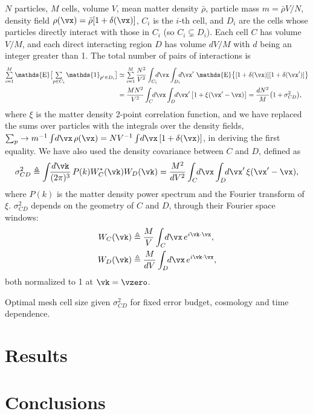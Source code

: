 \documentclass[a4paper]{article}
\DeclareMathOperator*{\E}{\mathds{E}}
\DeclareMathOperator{\tsum}{{\textstyle\sum}}
\newcommand{\1}{\mathds{1}}
\renewcommand{\d}{d}
\newcommand{\YL}[1]{\textcolor{Bittersweet}{#1}}
\begin{document}
$N$ particles, $M$ cells, volume $V$, mean matter density
$\bar\rho$, particle mass $m = \bar\rho V / N$, density field $\rho(\vx)
= \bar\rho [1 + \delta(\vx)]$, $C_i$ is the $i$-th cell, and $D_i$ are
the cells whose particles directly interact with those in $C_i$ (so $C_i
\subsetneq D_i$).
Each cell $C$ has volume $V / M$, and each direct interacting region $D$
has volume $d V / M$ with $d$ being an integer greater than 1.
The total number of pairs of interactions is
%
\begin{align}
\tsum_{i=1}^M \E \bigl[ \tsum_{p\in C_i} \1_{p'\in D_i} \bigr]
%
&\simeq \tsum_{i=1}^M \frac{N^2}{V^2}
  \int_{C_i} \!\!\!\d\vx \int_{D_i} \!\!\!\d\vx'\,
  \E \bigl\{ [1 + \delta(\vx)] [1 + \delta(\vx')] \bigr\} \nonumber\\
%
&= \frac{M N^2}{V^2} \int_C \!\!\d\vx \int_D \!\!\d\vx'\,
  \bigl[ 1 + \xi(\vx' - \vx) \bigr]
= \frac{d N^2}M  \bigl( 1 + \sigma^2_{CD} \bigr),
\end{align}
%
where $\xi$ is the matter density 2-point correlation function, and we
have replaced the sums over particles with the integrals over the
density fields, $\sum_p \to m^{-1} \int \!\d\vx\, \rho(\vx) = N V^{-1}
\int \!\d\vx\, [1 + \delta(\vx)]$, in deriving the first equality.
We have also used the density covariance between $C$ and $D$, defined as
%
\begin{equation}
\sigma^2_{CD} \triangleq \int \!\!\frac{\d\vk}{(2\pi)^3}\,
  P(k) W_C^*(\vk) W_D(\vk)
= \frac{M^2}{d V^2} \int_C \!\!\d\vx \int_D \!\!\d\vx'\,
  \xi(\vx' - \vx),
\end{equation}
%
where $P(k)$ is the matter density power spectrum and the Fourier
transform of $\xi$.
$\sigma^2_{CD}$ depends on the geometry of $C$ and $D$, through their
Fourier space windows:
%
\begin{align}
W_C(\vk) &\triangleq \frac{M}V \int_C \!\!\d\vx\, e^{i\vk\cdot\vx},
  \nonumber\\
W_D(\vk) &\triangleq \frac{M}{dV} \int_D \!\!\d\vx\, e^{i\vk\cdot\vx},
\end{align}
%
both normalized to 1 at $\vk=\vzero$.


\YL{Optimal mesh cell size given $\sigma^2_{CD}$ for fixed error budget,
cosmology and time dependence.}




\section{Results}


\section{Conclusions}








\end{document}
